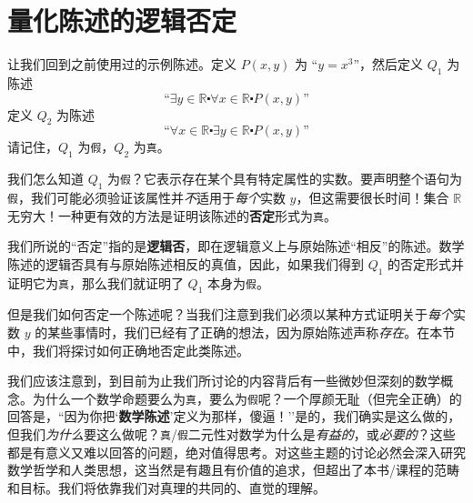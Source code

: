\section{量化陈述的逻辑否定}\label{sec:section4.4}

让我们回到之前使用过的示例陈述。定义 $P(x, y)$ 为 ``$y = x^3$''，然后定义 $Q_1$ 为陈述
\[\text{``}\exists y \in \mathbb{R} \centerdot \forall x \in \mathbb{R} \centerdot P(x, y)\text{''}\]
定义 $Q_2$ 为陈述
\[\text{``}\forall x \in \mathbb{R} \centerdot \exists y \in \mathbb{R} \centerdot P(x, y)\text{''}\]
请记住，$Q_1$ 为\verb|假|，$Q_2$ 为\verb|真|。

我们怎么知道 $Q_1$ 为\verb|假|？它表示存在某个具有特定属性的实数。要声明整个语句为\verb|假|，我们可能必须验证该属性并\emph{不}适用于\emph{每个}实数 $y$，但这需要很长时间！集合 $\mathbb{R}$ 无穷大！一种更有效的方法是证明该陈述的\textbf{否定}形式为\verb|真|。

我们所说的``否定''指的是\textbf{逻辑否}，即在逻辑意义上与原始陈述``相反''的陈述。数学陈述的逻辑否具有与原始陈述相反的真值，因此，如果我们得到 $Q_1$ 的否定形式并证明它为\verb|真|，那么我们就证明了 $Q_1$ 本身为\verb|假|。

但是我们如何否定一个陈述呢？当我们注意到我们必须以某种方式证明关于\emph{每个}实数 $y$ 的某些事情时，我们已经有了正确的想法，因为原始陈述声称\emph{存在}。在本节中，我们将探讨如何正确地否定此类陈述。

我们应该注意到，到目前为止我们所讨论的内容背后有一些微妙但深刻的数学概念。为什么一个数学命题要么为\verb|真|，要么为\verb|假|呢？一个厚颜无耻（但完全正确）的回答是，``因为你把`\textbf{数学陈述}'定义为那样，傻逼！''是的，我们确实是这么做的，但我们\emph{为什么}要这么做呢？\verb|真|/\verb|假|二元性对数学为什么是\emph{有益的}，或\emph{必要的}？这些都是有意义又难以回答的问题，绝对值得思考。对这些主题的讨论必然会深入研究数学哲学和人类思想，这当然是有趣且有价值的追求，但超出了本书/课程的范畴和目标。我们将依靠我们对真理的共同的、直觉的理解。













